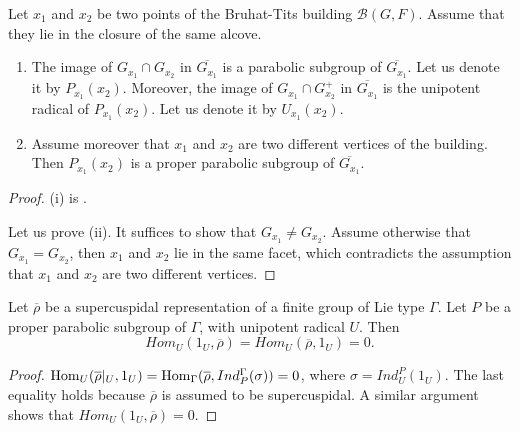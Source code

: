 		
		
		\begin{lemma}\label{Lem Passage to Residue Field}
			Let $x_1$ and $x_2$ be two points of the Bruhat-Tits building $\mathcal{B}(G, F)$. Assume that they lie in the closure of the same alcove.
			\begin{enumerate}
				\item[(i)]   The image of $G_{x_1} \cap G_{x_2}$ in $\overline{G_{x_1}}$ is a parabolic subgroup of $\overline{G_{x_1}}$. Let us denote it by $P_{x_1}(x_2)$. Moreover, the image of $G_{x_1} \cap G_{x_2}^+$ in $\overline{G_{x_1}}$ is the unipotent radical of $P_{x_1}(x_2)$. Let us denote it by $U_{x_1}(x_2)$.
				\item[(ii)] 	Assume moreover that $x_1$ and $x_2$ are two different vertices of the building. Then $P_{x_1}(x_2)$ is a proper parabolic subgroup of $\overline{G_{x_1}}$.
			\end{enumerate}
		\end{lemma}
		
		\begin{proof}
			(i) is \cite[II.5.1.(k)]{vigneras1996representations}.
			
			Let us prove (ii). It suffices to show that $G_{x_1} \neq G_{x_2}$. Assume otherwise that $G_{x_1}=G_{x_2}$, then $x_1$ and $x_2$ lie in the same facet, which contradicts the assumption that $x_1$ and $x_2$ are two different vertices.
		\end{proof}
		
		\begin{lemma}\label{Lem Hom_U(1_U, SC)}
			Let $\overline{\rho}$ be a supercuspidal representation of a finite group of Lie type $\Gamma$. Let $P$ be a proper parabolic subgroup of $\Gamma$, with unipotent radical $U$. Then
			$$Hom_U(1_U, \overline{\rho})=Hom_U(\overline{\rho}, 1_U)=0.$$
		\end{lemma}
		
		\begin{proof}
			$\operatorname{\operatorname{Hom}}_U(\overline{\rho}|_U, 1_U)=\operatorname{\operatorname{Hom}}_{\Gamma}(\overline{\rho}, Ind_P^{\Gamma}(\sigma))=0$, where $\sigma=Ind_U^P(1_U)$. The last equality holds because $\overline{\rho}$ is assumed to be supercuspidal. A similar argument shows that $Hom_U(1_U, \overline{\rho})=0$.  
			
		\end{proof}
		
